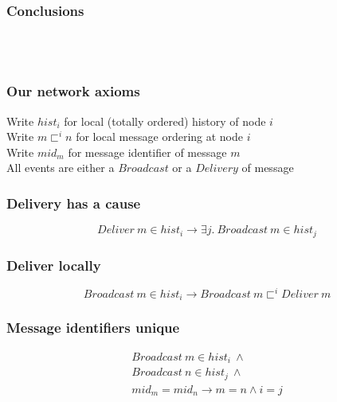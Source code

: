 \documentclass[professionalfonts,smallfonts]{beamer}
\begin{document}
\begin{frame}
\frametitle{Conclusions}
\\[1.5ex]
\\[1.5ex]
\end{frame}

\begin{frame}
\frametitle{Our network axioms}
Write $hist_i$ for local (totally ordered) history of node $i$
\\[1.5ex]
Write $m \sqsubset^i n$ for local message ordering at node $i$
\\[1.5ex]
Write $mid_m$ for message identifier of message $m$
\\[1.5ex]
All events are either a $Broadcast$ or a $Delivery$ of message
\end{frame}

\begin{frame}
\frametitle{Delivery has a cause}
\begin{displaymath}
Deliver\ m \in hist_i \longrightarrow \exists j.\ Broadcast\ m \in hist_j
\end{displaymath}
\end{frame}

\begin{frame}
\frametitle{Deliver locally}
\begin{displaymath}
Broadcast\ m \in hist_i \longrightarrow Broadcast\ m \sqsubset^i Deliver\ m
\end{displaymath}
\end{frame}

\begin{frame}
\frametitle{Message identifiers unique}
\begin{gather*}
Broadcast\ m \in hist_i\ \wedge \\
Broadcast\ n \in hist_j\ \wedge \\
mid_m = mid_n \longrightarrow m = n \wedge i = j
\end{gather*}
\end{frame}
\end{document}
